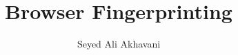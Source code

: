 \documentclass[sigconf, anonymous]{acmart}
\begin{document}
\title{Browser Fingerprinting}

\author[1]{Seyed Ali Akhavani}



\maketitle

% 


% 




%

\end{document}
